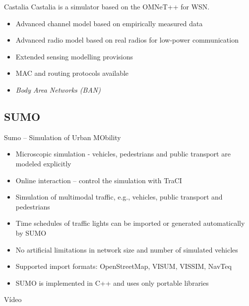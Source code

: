 \documentclass{beamer}
\begin{document}
\begin{frame}

\begin{block}{Castalia}
Castalia is a simulator based on the OMNeT++ for WSN.
	\begin{itemize}
		\item Advanced channel model based on empirically measured data
		\item Advanced radio model based on real radios for low-power communication
		\item Extended sensing modelling provisions
		\item MAC and routing protocols available
		\item \textit{Body Area Networks (BAN)}
	\end{itemize}
\end{block}
\end{frame}

\subsection{SUMO}

\begin{frame}

\begin{block}{Sumo -- Simulation of Urban MObility} 

	\begin{itemize}
		\item Microscopic simulation - vehicles, pedestrians and public transport are modeled explicitly
		\item Online interaction – control the simulation with TraCI
		\item Simulation of multimodal traffic, e.g., vehicles, public transport and pedestrians
		\item Time schedules of traffic lights can be imported or generated automatically by SUMO
		\item No artificial limitations in network size and number of simulated vehicles
		\item Supported import formats: OpenStreetMap, VISUM, VISSIM, NavTeq
		\item SUMO is implemented in C++ and uses only portable libraries
	\end{itemize}

\end{block}
\end{frame}

\begin{frame}

\begin{exampleblock}{Vídeo}
	\centering
\end{exampleblock}
\end{frame}
\end{document}
